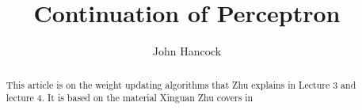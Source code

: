 \documentclass[format=acmsmall, review=false, screen=true]{acmart}
\begin{document}
\title[Lecture 4]{Continuation of Perceptron}

\author{John Hancock}

\begin{abstract}
This article is on the weight updating algorithms that Zhu explains in Lecture
3 and lecture 4.
It is based on the material Xinguan Zhu covers in \cite{zhuPerceptron}
\end{abstract}


%
%
%
%






\maketitle

\renewcommand{\shortauthors}{J.Hancock }


\end{document}
